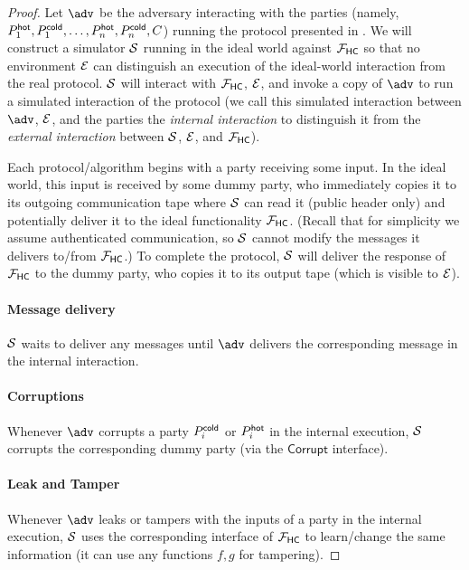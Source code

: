 \begin{proof}
Let $\adv$ be the adversary interacting with the parties (namely, $P_1^{\mathsf{hot}}, P_1^{\mathsf{cold}},\allowbreak \dots, P_n^{\mathsf{hot}}, P_n^{\mathsf{cold}}, C$) running the protocol presented in . We will construct a simulator $\mathcal{S}$ running in the ideal world against $\mathcal{F}_\mathsf{HC}$ so that no environment $\mathcal{E}$ can distinguish an execution of the ideal-world interaction from the real protocol. $\mathcal{S}$ will interact with $\mathcal{F}_\mathsf{HC}$, $\mathcal{E}$, and invoke a copy of $\adv$ to run a simulated interaction of the protocol (we call this simulated interaction between $\adv$, $\mathcal{E}$, and the parties the \emph{internal interaction} to distinguish it from the \emph{external interaction} between $\mathcal{S}$, $\mathcal{E}$, and $\mathcal{F}_\mathsf{HC}$).

Each protocol/algorithm begins with a party receiving some input. In the ideal world, this input is received by some dummy party, who immediately copies it to its outgoing communication tape where $\mathcal{S}$ can read it (public header only) and potentially deliver it to the ideal functionality $\mathcal{F}_\mathsf{HC}$. (Recall that for simplicity we assume authenticated communication, so $\mathcal{S}$ cannot modify the messages it delivers to/from $\mathcal{F}_\mathsf{HC}$.) To complete the protocol, $\mathcal{S}$ will deliver the response of $\mathcal{F}_\mathsf{HC}$ to the dummy party, who copies it to its output tape (which is visible to $\mathcal{E}$).

\renewcommand{\labelitemi}{\textendash}
\paragraph{Message delivery} $\mathcal{S}$ waits to deliver any messages until $\adv$ delivers the corresponding message in the internal interaction.

\paragraph{Corruptions} Whenever $\adv$ corrupts a party $P_i^{\mathsf{cold}}$ or $P_i^{\mathsf{hot}}$ in the internal execution, $\mathcal{S}$ corrupts the corresponding dummy party (via the $\mathsf{Corrupt}$ interface).

\paragraph{Leak and Tamper}
Whenever $\adv$ leaks or tampers with the inputs of a party in the internal execution, $\mathcal{S}$ uses the corresponding interface of $\mathcal{F}_\mathsf{HC}$ to learn/change the same information (it can use any functions $f,g$ for tampering). %


\end{proof}
